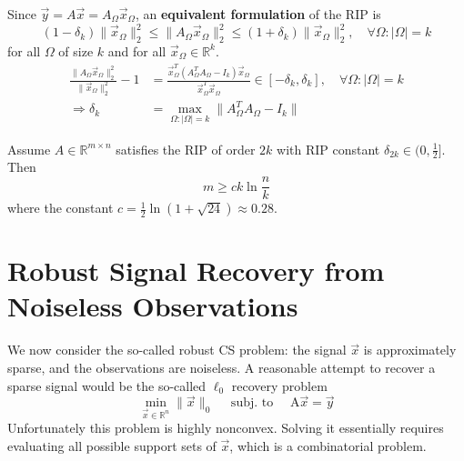 \documentclass[11pt]{elegantbook}
\begin{document}
\begin{claim}
    Since $\vec{y}=A \vec{x}=A_\Omega \vec{x}_\Omega$, an \textbf{equivalent formulation} of the RIP is $$(1-\delta_k)\|\vec{x}_\Omega\|^2_2\leq\|A_\Omega \vec{x}_\Omega\|_2^2\leq (1+\delta_k)\|\vec{x}_\Omega\|^2_2,\quad \forall \Omega: |\Omega|=k$$
for all $\Omega$ of size $k$ and for all $\vec{x}_\Omega\in \mathbb{R}^k$.
\begin{equation}
    \begin{aligned}
        \frac{\|A_\Omega \vec{x}_\Omega\|_2^2}{\|\vec{x}_\Omega\|_2^2}-1&=\frac{\vec{x}_\Omega^T\left(A^T_\Omega A_\Omega-I_k\right)\vec{x}_\Omega}{\vec{x}_\Omega^T\vec{x}_\Omega}\in\left[-\delta_k,\delta_k\right],\quad \forall \Omega: |\Omega|=k\\
        \Rightarrow \delta_k&=\max_{\Omega:|\Omega|=k}\|A^T_\Omega A_\Omega-I_k\|
    \end{aligned}
    \nonumber
\end{equation}
\end{claim}

\begin{theorem}
    Assume $A\in \mathbb{R}^{m\times n}$ satisfies the RIP of order $2k$ with RIP constant $\delta_{2k}\in (0,\frac{1}{2}]$. Then $$m\geq ck\ln\frac{n}{k}$$ where the constant $c=\frac{1}{2}\ln(1+\sqrt{24})\approx 0.28$.
\end{theorem}

\section{Robust Signal Recovery from Noiseless Observations}
We now consider the so-called robust CS problem: the signal $\vec{x}$ is approximately sparse, and the observations are noiseless. A reasonable attempt to recover a sparse signal would be the so-called $\ell_0$ recovery problem
$$
\min _{\vec{x} \in \mathbb{R}^n}\|\vec{x}\|_0 \quad \text { subj. to } \quad \mathrm{A} \vec{x}=\vec{y}
$$
Unfortunately this problem is highly nonconvex. Solving it essentially requires evaluating all possible support sets of $\vec{x}$, which is a combinatorial problem.
\end{document}
